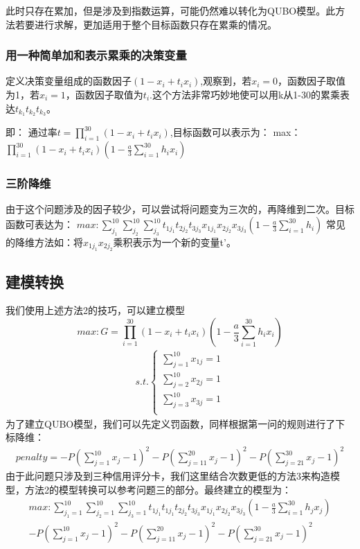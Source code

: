 \documentclass{MathorCupmodeling}
\begin{document}
此时只存在累加，但是涉及到指数运算，可能仍然难以转化为QUBO模型。此方法若要进行求解，更加适用于整个目标函数只存在累乘的情况。
\subsubsection{用一种简单加和表示累乘的决策变量}
定义决策变量组成的函数因子$(1-x_{i}+t_{i}x_{i})$,观察到，若$x_{i} = 0$，函数因子取值为1，若$x_{i} = 1$，函数因子取值为$t_{i}$.这个方法非常巧妙地使可以用k从1-30的累乘表达$t_{k_{1}}t_{k_{2}}t_{k_{3}}$。

即：
通过率$t=\prod_{i=1}^{30}(1-x_{i}+t_{i}x_{i})$,目标函数可以表示为：
max：$\prod_{i=1}^{30}(1-x_{i}+t_{i}x_{i})(1-\frac{a}{3}\sum_{i=1}^{30}h_{i}x_{i})$
\subsubsection{三阶降维}
由于这个问题涉及的因子较少，可以尝试将问题变为三次的，再降维到二次。目标函数可表达为：
$max:\sum_{j_{1}}^{10}\sum_{j_{2}}^{10}\sum_{j_{3}}^{10}t_{1j_{1}}t_{2j_{2}}t_{3j_{3}}x_{1j_{1}}x_{2j_{2}}x_{3j_{3}}(1-\frac{a}{3}\sum_{i=1}^{30}h_{i})$
常见的降维方法如：将$x_{1j_{1}}x_{2j_{2}}$乘积表示为一个新的变量t’。
\subsection{建模转换}
我们使用上述方法2的技巧，可以建立模型 
$$
max: G=\prod_{i=1}^{30}(1-x_{i}+t_{i}x_{i})(1-\frac{a}{3}\sum_{i=1}^{30}h_{i}x_{i})
$$
\begin{gather}
s.t.
\left\{
\begin{aligned}
\sum_{j=1}^{10}x_{1j} =1   \\
\sum_{j=2}^{10}x_{2j} =1   \\
\sum_{j=3}^{10}x_{3j} =1 \\
\end{aligned}
\right.
\end{gather} 
为了建立QUBO模型，我们可以先定义罚函数，同样根据第一问的规则进行了下标降维：
$$
\begin{aligned}
penalty = -P(\sum_{j=1}^{10}x_{j} -1)^{2}-P(\sum_{j=11}^{20}x_{j} -1)^{2}-P(\sum_{j=21}^{30}x_{j} -1)^{2}
\end{aligned}
$$
由于此问题只涉及到三种信用评分卡，我们这里结合次数更低的方法3来构造模型，方法2的模型转换可以参考问题三的部分。最终建立的模型为：
$$
\begin{aligned}
max:\sum_{j_{1}=1}^{10}\sum_{j_{2}=1}^{10}\sum_{j_{3}=1}^{10}t_{1j_{1}}t_{1j_{1}}t_{2j_{2}}t_{3j_{3}}x_{1j_{1}}x_{2j_{2}}x_{3j_{3}}(1-\frac{a}{3}\sum_{i=1}^{30}h_{j}x_{j})\\
-P(\sum_{j=1}^{10}x_{j} -1)^{2}-P(\sum_{j=11}^{20}x_{j} -1)^{2}-P(\sum_{j=21}^{30}x_{j} -1)^{2}
\end{aligned}
$$
\end{document}
